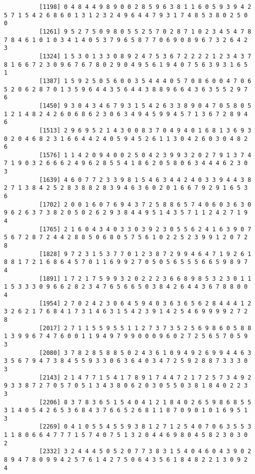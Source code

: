 \documentclass{article}
\begin{document}
\begin{itemize}
\begin{scriptsize}
\begin{verbatim}
		  [1198] 0 4 8 4 4 9 8 9 0 0 2 8 5 9 6 3 8 1 1 6 0 5 9 3 9 4 2 5 7 1 5 4 2 6 8 6 0 1 3 1 2 3 2 4 9 6 4 4 7 9 3 1 7 4 8 5 3 8 0 2 5 0 0
		  [1261] 9 5 2 7 5 0 9 8 0 5 5 2 5 7 0 2 8 7 1 0 2 3 4 5 4 7 8 7 8 4 6 1 0 1 0 3 4 1 4 0 5 3 7 9 6 5 8 7 7 0 6 9 0 8 9 6 7 3 2 6 4 2 3
		  [1324] 1 5 3 0 1 3 3 0 8 9 2 4 7 5 3 6 7 2 2 2 2 1 2 3 4 3 7 8 1 6 6 7 2 3 0 9 6 7 6 7 8 0 2 9 0 4 9 5 6 1 9 4 0 7 5 6 3 9 3 1 6 5 1
		  [1387] 1 5 9 2 5 0 5 6 0 0 3 5 4 4 4 0 5 7 0 8 6 0 0 4 7 0 6 5 2 0 6 2 8 7 0 1 3 5 9 6 4 4 3 5 6 4 4 3 8 8 9 6 6 4 3 6 3 5 5 2 9 7 6
		  [1450] 9 3 0 4 3 4 6 7 9 3 1 5 4 2 6 3 3 8 9 0 4 7 0 5 8 0 5 1 2 1 4 8 2 4 2 6 0 6 8 6 2 3 0 6 3 4 9 4 5 9 9 4 5 7 1 3 6 7 2 8 9 4 6
		  [1513] 2 9 6 9 5 2 1 4 3 0 0 8 3 7 0 4 9 4 0 1 6 8 1 3 6 9 3 0 2 0 4 6 8 2 3 1 6 6 4 4 2 4 0 5 9 4 5 2 6 1 1 3 0 4 2 6 0 3 0 4 8 2 6
		  [1576] 1 1 4 2 0 9 4 0 0 2 5 0 4 2 3 9 9 3 2 0 2 7 9 1 3 7 4 7 1 9 0 3 2 6 6 6 2 4 9 6 2 8 5 5 4 1 8 6 2 0 5 8 0 6 3 4 4 4 6 2 3 0 3
		  [1639] 4 6 0 7 7 2 3 3 9 8 1 5 4 6 3 4 4 2 4 0 3 3 9 4 4 3 8 2 7 1 3 8 4 2 5 2 8 3 8 8 2 8 3 9 4 6 3 6 0 2 0 1 6 6 7 9 2 9 1 6 5 3 6
		  [1702] 2 0 0 1 6 0 7 6 9 4 3 7 2 5 8 8 6 5 7 4 0 6 0 3 6 3 0 9 6 2 6 3 7 3 8 2 0 5 0 2 6 2 9 3 8 4 4 9 5 1 4 3 5 7 1 1 2 4 2 7 1 9 4
		  [1765] 2 1 6 0 4 3 4 0 3 3 0 3 9 2 3 0 5 5 6 2 4 1 6 3 9 0 7 5 6 7 2 8 7 2 4 4 2 8 8 5 0 6 8 0 5 7 5 6 1 0 2 2 5 2 3 9 9 1 2 0 7 2 8
		  [1828] 9 7 2 3 1 5 3 7 7 0 1 2 3 8 7 2 9 9 4 6 4 7 1 9 2 6 1 8 8 1 7 2 1 6 8 6 4 5 7 0 1 1 6 9 9 2 7 0 5 0 5 6 5 5 5 6 6 5 9 8 9 7 4
		  [1891] 1 7 2 1 7 5 9 9 3 2 0 2 2 2 3 6 6 8 9 8 5 3 2 3 0 1 1 1 5 3 3 3 0 9 6 6 2 8 2 3 4 7 6 5 6 6 5 0 3 8 4 2 6 4 4 3 6 7 8 8 0 0 4
		  [1954] 2 7 0 2 4 2 3 0 6 4 5 9 4 0 3 6 3 6 5 6 2 8 4 4 4 1 2 3 2 6 2 1 7 6 8 4 1 7 3 1 4 6 3 1 5 4 2 3 9 1 4 2 5 4 6 9 9 9 9 2 7 2 8
		  [2017] 2 7 1 1 5 5 9 5 5 1 1 2 7 3 7 3 5 2 5 6 9 8 6 0 5 8 8 1 3 9 9 6 7 4 7 6 0 0 1 1 9 4 9 7 9 9 0 0 0 9 6 0 2 7 2 5 6 5 7 0 5 9 3
		  [2080] 3 7 8 2 8 5 8 8 5 0 2 4 3 6 1 0 9 4 9 2 6 9 9 4 4 6 3 3 5 6 7 9 4 7 3 8 4 5 5 9 3 3 0 6 3 6 4 0 3 4 7 2 5 9 2 8 8 7 3 3 3 0 3
		  [2143] 2 1 4 7 7 1 5 4 1 7 8 9 1 7 4 4 7 2 1 7 2 5 7 3 4 9 2 9 3 3 8 7 2 7 0 5 7 0 5 1 3 4 3 8 0 6 2 0 3 0 5 5 0 3 8 1 8 4 0 2 2 3 3
		  [2206] 8 3 7 8 3 6 5 1 5 4 0 4 1 2 1 8 4 0 2 6 5 9 8 6 8 5 5 3 1 4 0 5 4 2 6 5 3 6 8 4 3 7 6 6 5 2 6 8 1 1 8 7 0 9 0 1 0 1 6 9 5 1 3
		  [2269] 0 4 1 0 5 5 4 5 5 9 3 8 1 2 7 1 2 5 4 0 7 0 6 3 5 5 3 1 1 8 0 6 6 4 7 7 7 1 5 7 4 0 7 5 1 3 2 0 4 4 6 9 8 0 4 5 8 2 3 0 3 0 2
		  [2332] 3 2 4 4 4 5 0 5 2 0 7 7 3 8 3 1 5 4 0 4 6 0 4 3 9 0 2 8 9 4 7 8 0 9 9 4 2 5 7 6 1 4 2 7 5 0 6 4 3 5 6 1 8 4 8 2 2 1 3 0 9 2 4

\end{verbatim}
\end{scriptsize}
\end{itemize}
\end{document}
